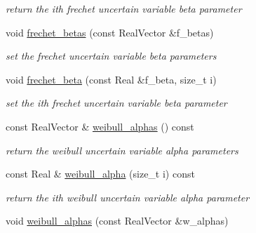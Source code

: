 \begin{DoxyCompactItemize}
\begin{DoxyCompactList}\small\item\em return the ith frechet uncertain variable beta parameter \end{DoxyCompactList}\item 
void \hyperlink{classPecos_1_1AleatoryDistParams_aae2682b3e6dd71d00c4087e5fedb7526}{frechet\+\_\+betas} (const Real\+Vector \&f\+\_\+betas)\label{classPecos_1_1AleatoryDistParams_aae2682b3e6dd71d00c4087e5fedb7526}

\begin{DoxyCompactList}\small\item\em set the frechet uncertain variable beta parameters \end{DoxyCompactList}\item 
void \hyperlink{classPecos_1_1AleatoryDistParams_af9a1816babff59029721faedbbcb26b3}{frechet\+\_\+beta} (const Real \&f\+\_\+beta, size\+\_\+t i)\label{classPecos_1_1AleatoryDistParams_af9a1816babff59029721faedbbcb26b3}

\begin{DoxyCompactList}\small\item\em set the ith frechet uncertain variable beta parameter \end{DoxyCompactList}\item 
const Real\+Vector \& \hyperlink{classPecos_1_1AleatoryDistParams_af77981f123476fd35f2a7b9b04bf76ee}{weibull\+\_\+alphas} () const \label{classPecos_1_1AleatoryDistParams_af77981f123476fd35f2a7b9b04bf76ee}

\begin{DoxyCompactList}\small\item\em return the weibull uncertain variable alpha parameters \end{DoxyCompactList}\item 
const Real \& \hyperlink{classPecos_1_1AleatoryDistParams_a775e2a7df7c50550d55ca9b8e2107ff6}{weibull\+\_\+alpha} (size\+\_\+t i) const \label{classPecos_1_1AleatoryDistParams_a775e2a7df7c50550d55ca9b8e2107ff6}

\begin{DoxyCompactList}\small\item\em return the ith weibull uncertain variable alpha parameter \end{DoxyCompactList}\item 
void \hyperlink{classPecos_1_1AleatoryDistParams_adc7054af0871874b946d4f1a6cd1f575}{weibull\+\_\+alphas} (const Real\+Vector \&w\+\_\+alphas)\label{classPecos_1_1AleatoryDistParams_adc7054af0871874b946d4f1a6cd1f575}


\end{DoxyCompactItemize}

